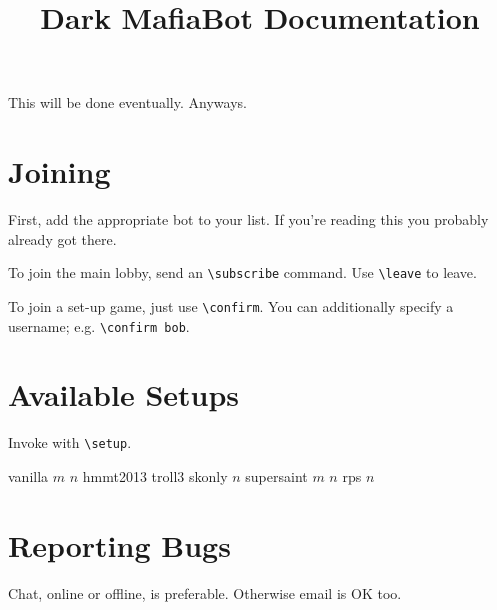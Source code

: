 \documentclass[11pt]{scrartcl}
\begin{document}
\title{Dark MafiaBot Documentation}
\maketitle

This will be done eventually.  Anyways.

\section{Joining}
First, add the appropriate bot to your list.  If you're reading this you probably already got there.

To join the main lobby, send an \verb+\subscribe+ command.  Use \verb+\leave+ to leave.

To join a set-up game, just use \verb+\confirm+.  You can additionally specify a username; e.g. \verb+\confirm bob+.

\section{Available Setups}
Invoke with \verb+\setup+.

\begin{itemize}
	\ii vanilla $m$ $n$
	\ii hmmt2013
	\ii troll3
	\ii skonly $n$
	\ii supersaint $m$ $n$
	\ii rps $n$
\end{itemize}

\section{Reporting Bugs}
Chat, online or offline, is preferable.  Otherwise email is OK too.
\end{document}
